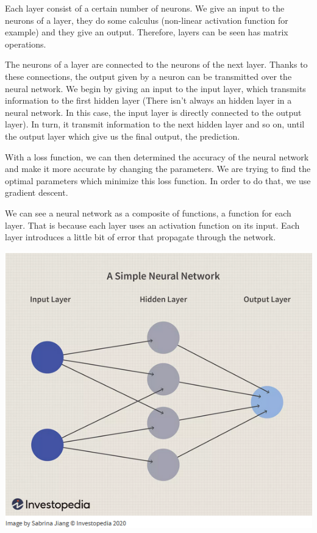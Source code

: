 \documentclass[10pt,a4paper]{article}
\theoremstyle{definition}
\theoremstyle{definition}
\begin{document}
Each layer consist of a certain number of neurons. We give an input to the neurons of a layer, they do some calculus (non-linear activation function for example) and they give an output. Therefore, layers can be seen has matrix operations. 

The neurons of a layer are connected to the neurons of the next layer. Thanks to these connections, the output given by a neuron can be transmitted over the neural network. We begin by giving an input to the input layer, which transmits information to the first hidden layer (There isn't always an hidden layer in a neural network. In this case, the input layer is directly connected to the output layer). In turn, it transmit information to the next hidden layer and so on, until the output layer which give us the final output, the prediction. 

With a loss function, we can then determined the accuracy of the neural network and make it more accurate by changing the parameters. We are trying to find the optimal parameters which minimize this loss function. In order to do that, we use gradient descent.

We can see a neural network as a composite of functions, a function for each layer. That is because each layer uses an activation function on its input. Each layer introduces a little bit of error that propagate through the network.

\begin{center}
\includegraphics[scale=0.55]{nn.png}
\end{center}  
\end{document}
